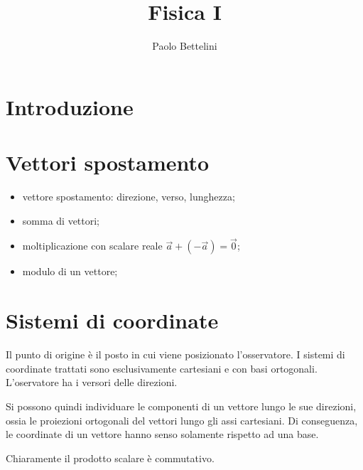 \documentclass[a4paper]{article}
\title{Fisica I}
\author{Paolo Bettelini}
\date{}
\begin{document}
\maketitle
\tableofcontents

\section{Introduzione}

\section{Vettori spostamento}

\begin{itemize}
    \item vettore spostamento: direzione, verso, lunghezza;
    \item somma di vettori;
    \item moltiplicazione con scalare reale \(\vec{a} + (-\vec{a}) = \vec{0}\);
    \item modulo di un vettore;
\end{itemize}


\section{Sistemi di coordinate}

Il punto di origine è il posto in cui viene posizionato l'osservatore.
I sistemi di coordinate trattati sono esclusivamente cartesiani e con basi ortogonali.
L'oservatore ha i versori delle direzioni.

Si possono quindi individuare le componenti di un vettore lungo le sue direzioni, ossia
le proiezioni ortogonali del vettori lungo gli assi cartesiani.
Di conseguenza, le coordinate di un vettore hanno senso solamente rispetto ad una base.


Chiaramente il prodotto scalare è commutativo.
\end{document}
